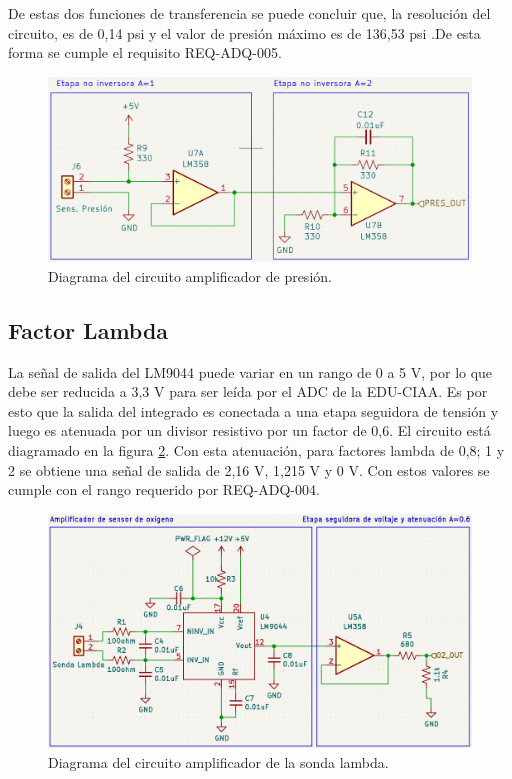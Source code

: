 De estas dos funciones de transferencia se puede concluir que, la resolución del circuito, es de 0,14 psi y el valor de presión máximo es de 136,53 psi .De esta forma se cumple el requisito REQ-ADQ-005.

\begin{figure}[htpb]
\centering
\includegraphics[width=\textwidth]{./Figures/circuito-presion.png}
\caption{Diagrama del circuito amplificador de presión.}
\label{fig:circuito-presion}
\end{figure}
\break
\subsection{Factor Lambda}

La señal de salida del LM9044 puede variar en un rango de 0 a 5 V, por lo que debe ser reducida a 3,3 V para ser leída por el ADC de la EDU-CIAA. Es por esto que la salida del integrado es conectada a una etapa seguidora de tensión y luego es atenuada por un divisor resistivo por un factor de 0,6. El circuito está diagramado en la figura \ref{fig:circuito-o2}. Con esta atenuación, para factores lambda de 0,8; 1 y 2 se obtiene una señal de salida de 2,16 V, 1,215 V y 0 V. Con estos valores se cumple con el rango requerido por REQ-ADQ-004.

\begin{figure}[htpb]
\centering
\includegraphics[width=\textwidth]{./Figures/ampli-o2.png}
\caption{Diagrama del circuito amplificador de la sonda lambda.}
\label{fig:circuito-o2}
\end{figure}

